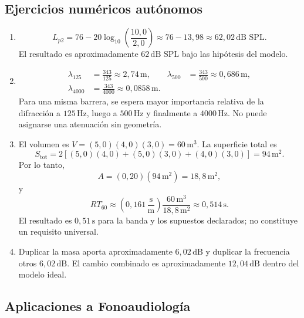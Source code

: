 \subsection*{Ejercicios numéricos autónomos}

\begin{enumerate}[label=\textbf{A\arabic*.},leftmargin=*]
    \item
    \[
        L_{p2}
          =76-20\log_{10}\!\left(\frac{10{,}0}{2{,}0}\right)
          \approx76-13{,}98
          \approx62{,}02\,\text{dB SPL}.
    \]
    El resultado es aproximadamente \(62\,\text{dB SPL}\) bajo las hipótesis
    del modelo.

    \item
    \[
        \begin{aligned}
            \lambda_{125}
              &=\frac{343}{125}\approx2{,}74\,\text{m},
            &
            \lambda_{500}
              &=\frac{343}{500}\approx0{,}686\,\text{m},\\
            \lambda_{4000}
              &=\frac{343}{4000}\approx0{,}0858\,\text{m}.
        \end{aligned}
    \]
    Para una misma barrera, se espera mayor importancia relativa de la
    difracción a \(125\,\text{Hz}\), luego a \(500\,\text{Hz}\) y finalmente a
    \(4000\,\text{Hz}\). No puede asignarse una atenuación sin geometría.

    \item El volumen es
    \(V=(5{,}0)(4{,}0)(3{,}0)=60\,\text{m}^3\). La superficie total es
    \[
        S_\mathrm{tot}
          =2[(5{,}0)(4{,}0)+(5{,}0)(3{,}0)+(4{,}0)(3{,}0)]
          =94\,\text{m}^2.
    \]
    Por lo tanto,
    \[
        A=(0{,}20)(94\,\text{m}^2)=18{,}8\,\text{m}^2,
    \]
    y
    \[
        RT_{60}
          \approx
          \left(0{,}161\,\frac{\text{s}}{\text{m}}\right)
          \frac{60\,\text{m}^3}{18{,}8\,\text{m}^2}
          \approx0{,}514\,\text{s}.
    \]
    El resultado es \(0{,}51\,\text{s}\) para la banda y los supuestos
    declarados; no constituye un requisito universal.

    \item Duplicar la masa aporta aproximadamente \(6{,}02\,\text{dB}\) y
    duplicar la frecuencia otros \(6{,}02\,\text{dB}\). El cambio combinado es
    aproximadamente \(12{,}04\,\text{dB}\) dentro del modelo ideal.
\end{enumerate}

\subsection*{Aplicaciones a Fonoaudiología}

